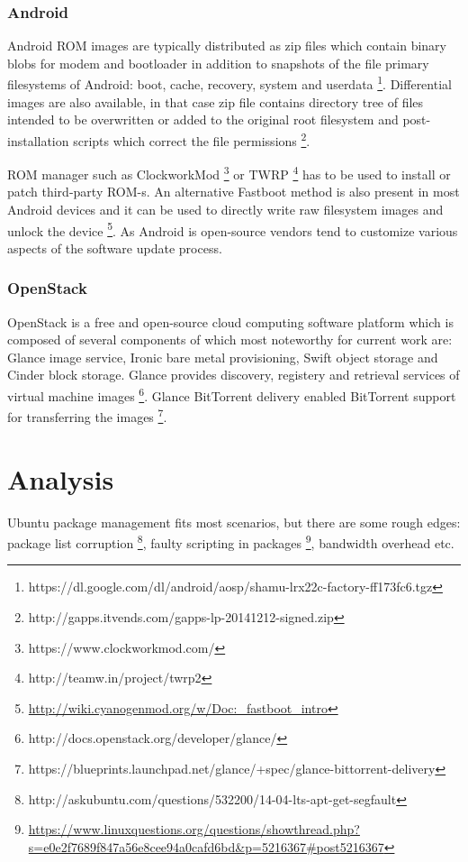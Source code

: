 \documentclass{article}
\begin{document}
\subsection{Android}

Android ROM images are typically distributed as zip files which contain 
binary blobs for modem and bootloader in addition to snapshots of the
file primary filesystems of Android: boot, cache, recovery, system and userdata
\footnote{https://dl.google.com/dl/android/aosp/shamu-lrx22c-factory-ff173fc6.tgz}.
Differential images are also available, in that case zip file contains
directory tree of files intended to be overwritten or added to the original
root filesystem and post-installation scripts which correct the file permissions
\footnote{http://gapps.itvends.com/gapps-lp-20141212-signed.zip}.

ROM manager such as ClockworkMod \footnote{https://www.clockworkmod.com/} or
TWRP \footnote{http://teamw.in/project/twrp2} has to be used to install or patch
third-party ROM-s.
An alternative Fastboot method is also present in most
Android devices and it can be used to directly write raw filesystem images and
unlock the device
\footnote{\url{http://wiki.cyanogenmod.org/w/Doc:_fastboot_intro}}.
As Android is open-source vendors tend to customize various aspects of the
software update process.




\subsection{OpenStack}

OpenStack is a free and open-source cloud computing software platform
which is composed of several components of which most noteworthy for current work are:
Glance image service, Ironic bare metal provisioning,
Swift object storage and Cinder block storage.
Glance provides discovery, registery and retrieval services of virtual machine images
\footnote{http://docs.openstack.org/developer/glance/}.
Glance BitTorrent delivery enabled BitTorrent support for transferring the images
\footnote{https://blueprints.launchpad.net/glance/+spec/glance-bittorrent-delivery}.


\chapter{Analysis}

Ubuntu package management fits most scenarios, but there are some rough edges:
package list corruption
\footnote{http://askubuntu.com/questions/532200/14-04-lts-apt-get-segfault},
faulty scripting in packages
\footnote{\url{https://www.linuxquestions.org/questions/showthread.php?s=e0e2f7689f847a56e8cee94a0cafd6bd&p=5216367#post5216367}},
bandwidth overhead etc.
\end{document}
